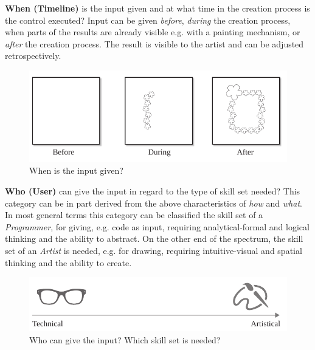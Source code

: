 
\textbf{When (Timeline)} is the input given and at what time in the creation process is the control executed? Input can be given \textit{before}, \textit{during} the creation process, when parts of the results are already visible e.g. with a painting mechanism, or \textit{after} the creation process. The result is visible to the artist and can be adjusted retrospectively.
\begin{figure}[H]
    \centering
        \includegraphics[width=\controlParamsFigWidth\linewidth]{figures/control_paradigms/when.pdf}
        \caption{When is the input given?}
\end{figure}



\noindent\textbf{Who (User)} can give the input in regard to the type of skill set needed? This category can be in part derived from the above characteristics of \textit{how} and \textit{what}. In most general terms this category can be classified the skill set of a \textit{Programmer}, for giving, e.g. code as input, requiring analytical-formal and logical thinking and the ability to abstract. On the other end of the spectrum, the skill set of an \textit{Artist} is needed, e.g. for drawing, requiring intuitive-visual and spatial thinking and the ability to create.

\begin{figure}[hbt]
    \centering
        \includegraphics[width=\controlParamsFigWidth\linewidth]{figures/control_paradigms/who.pdf}
        \caption{Who can give the input? Which skill set is needed?}
\end{figure}

